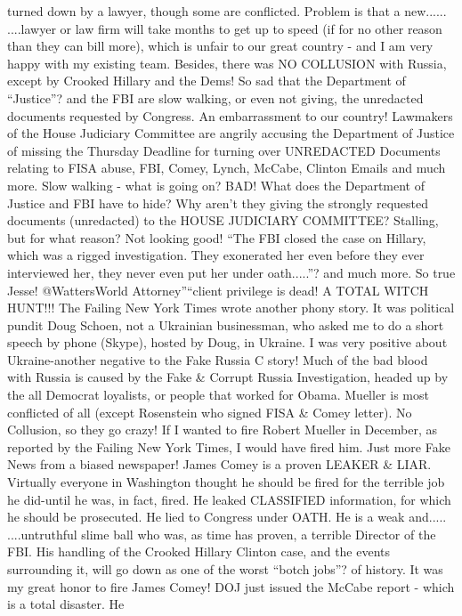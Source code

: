 turned down by a lawyer, though some are conflicted. Problem is that a
new...... ....lawyer or law firm will take months to get up to speed (if
for no other reason than they can bill more), which is unfair to our
great country - and I am very happy with my existing team. Besides,
there was NO COLLUSION with Russia, except by Crooked Hillary and the
Dems! So sad that the Department of ``Justice''? and the FBI are slow
walking, or even not giving, the unredacted documents requested by
Congress. An embarrassment to our country! Lawmakers of the House
Judiciary Committee are angrily accusing the Department of Justice of
missing the Thursday Deadline for turning over UNREDACTED Documents
relating to FISA abuse, FBI, Comey, Lynch, McCabe, Clinton Emails and
much more. Slow walking - what is going on? BAD! What does the
Department of Justice and FBI have to hide? Why aren't they giving the
strongly requested documents (unredacted) to the HOUSE JUDICIARY
COMMITTEE? Stalling, but for what reason? Not looking good! ``The FBI
closed the case on Hillary, which was a rigged investigation. They
exonerated her even before they ever interviewed her, they never even
put her under oath.....''? and much more. So true Jesse! @WattersWorld
Attorney''``client privilege is dead! A TOTAL WITCH HUNT!!! The Failing
New York Times wrote another phony story. It was political pundit Doug
Schoen, not a Ukrainian businessman, who asked me to do a short speech
by phone (Skype), hosted by Doug, in Ukraine. I was very positive about
Ukraine-another negative to the Fake Russia C story! Much of the bad
blood with Russia is caused by the Fake \& Corrupt Russia Investigation,
headed up by the all Democrat loyalists, or people that worked for
Obama. Mueller is most conflicted of all (except Rosenstein who signed
FISA \& Comey letter). No Collusion, so they go crazy! If I wanted to
fire Robert Mueller in December, as reported by the Failing New York
Times, I would have fired him. Just more Fake News from a biased
newspaper! James Comey is a proven LEAKER \& LIAR. Virtually everyone in
Washington thought he should be fired for the terrible job he did-until
he was, in fact, fired. He leaked CLASSIFIED information, for which he
should be prosecuted. He lied to Congress under OATH. He is a weak
and..... ....untruthful slime ball who was, as time has proven, a
terrible Director of the FBI. His handling of the Crooked Hillary
Clinton case, and the events surrounding it, will go down as one of the
worst ``botch jobs''? of history. It was my great honor to fire James
Comey! DOJ just issued the McCabe report - which is a total disaster. He
